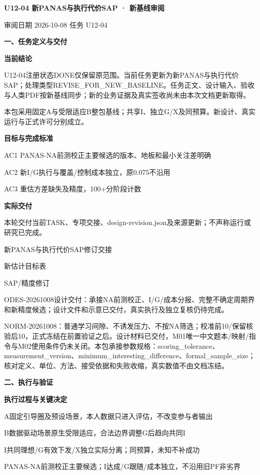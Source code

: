 \documentclass[11pt,a4paper]{article}
\newcommand{\reviewtitle}[1]{\begin{center}{\titlelatin\titlecjk\bfseries\fontsize{21}{28}\selectfont #1}\end{center}\vspace{8pt}}
\newcommand{\reviewsection}[1]{\par\Needspace{5\baselineskip}\vspace{10pt}\begin{center}{\titlelatin\titlecjk\bfseries\fontsize{14}{20}\selectfont #1}\end{center}}
\newcommand{\reviewsubsection}[1]{\par\Needspace{4\baselineskip}\vspace{4pt}\begin{center}{\titlelatin\titlecjk\bfseries\fontsize{12}{18}\selectfont #1}\end{center}}
\begin{document}
\reviewtitle{U12-\allowbreak{}04 新PANAS与执行代价SAP · 新基线审阅}
审阅日期 2026-\allowbreak{}10-\allowbreak{}08    任务 U12-\allowbreak{}04


\reviewsection{一、任务定义与交付}
\reviewsubsection{1.1 当前结论}
U12-\allowbreak{}04注册状态DONE仅保留原范围。当前任务更新为新PANAS与执行代价SAP；处理类型REVISE\_\allowbreak{}FOR\_\allowbreak{}NEW\_\allowbreak{}BASELINE。任务正文、设计输入、验收与人类PDF按新基线同步；新的业务证据及真实签收尚未由本次文档更新取得。


本包采用固定A与受限适应B整包基线；共享I、独立G/\allowbreak{}X及同预算。新设计、真实运行与正式许可分别成立。


\reviewsubsection{1.2 目标与完成标准}
AC1 PANAS-\allowbreak{}NA前测校正主要候选的版本、地板和最小关注差明确


AC2 新I/\allowbreak{}G执行与覆盖/\allowbreak{}控制成本独立，原0.075不沿用


AC3 重估方差缺失及精度，100+分阶段计数


\reviewsubsection{1.3 实际交付}
本轮交付当前TASK、专项交接、design-\allowbreak{}revision.json及来源更新；不声称运行或研究已完成。


新PANAS与执行代价SAP修订交接


新估计目标表


SAP/\allowbreak{}精度修订


ODES-\allowbreak{}20261008设计交付：承接NA前测校正、I/\allowbreak{}G/\allowbreak{}成本分报、完整不确定周期界和新精度候选；设计文件和示意已交付，真实执行及独立复核仍待完成。


NORM-\allowbreak{}20261008：普通学习间隙、不诱发压力、不按NA筛选；校准前10/\allowbreak{}保留核验后10，正式冻结在前置验证之后。设计材料已交付，M01唯一中文题本/\allowbreak{}映射/\allowbreak{}指令与M02使用条件仍未关闭。本包承接参数规格：scoring\_\allowbreak{}tolerance、measurement\_\allowbreak{}version、minimum\_\allowbreak{}interesting\_\allowbreak{}difference、formal\_\allowbreak{}sample\_\allowbreak{}size；核对定义、单位、方法、接受依据和失败收缩，真实数值不由文档冻结。


\reviewsection{二、执行与验证}
\reviewsubsection{2.1 执行过程与关键决定}
A固定引导圈及预设场景，本人数据只进入评估，不改变参与者输出


B数据驱动场景原生受限适应，合法边界调整G后趋向共同I


I共同理想/\allowbreak{}G有效下发/\allowbreak{}X独立实际分离；同预算，未知不补成功


PANAS-\allowbreak{}NA前测校正主要候选；I达成/\allowbreak{}G跟随/\allowbreak{}成本独立，不沿用旧PF非劣界
\end{document}
